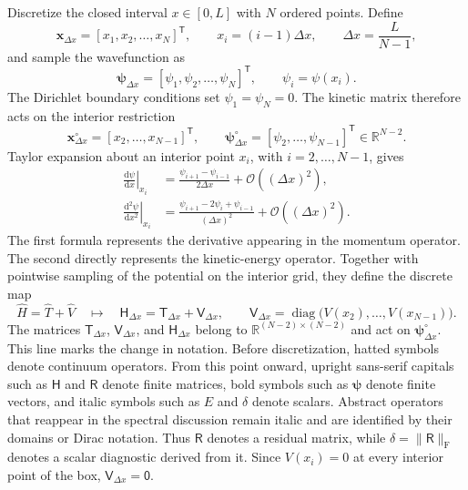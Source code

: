 \documentclass[11pt]{article}
\newcommand{\fro}{\mathrm{F}}
\newcommand{\RR}{\mathbb{R}}
\newcommand{\mat}[1]{\mathsf{#1}}
\newcommand{\vect}[1]{\boldsymbol{#1}}
\begin{document}
Discretize the closed interval $x\in[0,L]$ with $N$ ordered points. Define
\begin{equation*}
 \vect{x}_{\Delta x}=[x_1,x_2,\ldots,x_N]^{\mathsf T},
 \qquad
 x_i=(i-1)\Delta x,
 \qquad
 \Delta x=\frac{L}{N-1},
\end{equation*}
and sample the wavefunction as
\begin{equation*}
 \vect{\psi}_{\Delta x}=[\psi_1,\psi_2,\ldots,\psi_N]^{\mathsf T},
 \qquad
 \psi_i=\psi(x_i).
\end{equation*}
The Dirichlet boundary conditions set $\psi_1=\psi_N=0$. The kinetic matrix therefore
acts on the interior restriction
\begin{equation*}
 \vect{x}^{\circ}_{\Delta x}=[x_2,\ldots,x_{N-1}]^{\mathsf T},
 \qquad
 \vect{\psi}^{\circ}_{\Delta x}=[\psi_2,\ldots,\psi_{N-1}]^{\mathsf T}
 \in\RR^{N-2}.
\end{equation*}
Taylor expansion about an interior point $x_i$, with $i=2,\ldots,N-1$, gives
\begin{align*}
 \left.\frac{\mathrm{d}\psi}{\mathrm{d}x}\right|_{x_i}
 &=\frac{\psi_{i+1}-\psi_{i-1}}{2\Delta x}
   +\mathcal O\!\left((\Delta x)^2\right),\\
 \left.\frac{\mathrm{d}^2\psi}{\mathrm{d}x^2}\right|_{x_i}
 &=\frac{\psi_{i+1}-2\psi_i+\psi_{i-1}}{(\Delta x)^2}
   +\mathcal O\!\left((\Delta x)^2\right).
\end{align*}
The first formula represents the derivative appearing in the momentum operator. The
second directly represents the kinetic-energy operator. Together with pointwise
sampling of the potential on the interior grid, they define the discrete map
\[
 \widehat H=\widehat T+\widehat V
 \quad\longmapsto\quad
 \mat{H}_{\Delta x}=\mat{T}_{\Delta x}+\mat{V}_{\Delta x},
 \qquad
 \mat{V}_{\Delta x}
 =\operatorname{diag}\!\bigl(V(x_2),\ldots,V(x_{N-1})\bigr).
\]
The matrices $\mat{T}_{\Delta x}$, $\mat{V}_{\Delta x}$, and
$\mat{H}_{\Delta x}$ belong to $\RR^{(N-2)\times(N-2)}$ and act on
$\vect{\psi}^{\circ}_{\Delta x}$. This line marks the change in notation. Before
discretization, hatted symbols denote continuum operators. From this point onward,
upright sans-serif capitals such as $\mat{H}$ and $\mat{R}$ denote finite matrices,
bold symbols such as $\vect{\psi}$ denote finite vectors, and italic symbols such as
$E$ and $\delta$ denote scalars. Abstract operators that reappear in the spectral
discussion remain italic and are identified by their domains or Dirac notation. Thus
$\mat{R}$ denotes a residual matrix, while
$\delta=\lVert\mat{R}\rVert_{\fro}$ denotes a scalar diagnostic derived from it.
Since $V(x_i)=0$ at every interior point of the box,
$\mat{V}_{\Delta x}=\mat{0}$.
\end{document}
